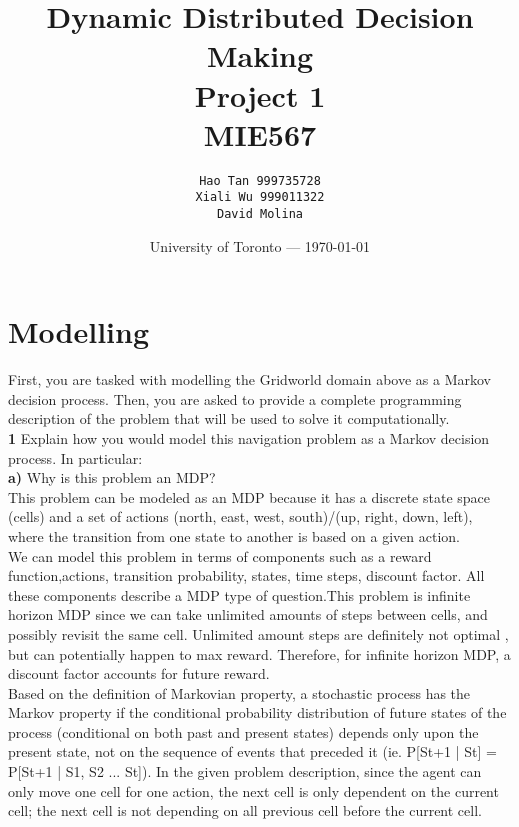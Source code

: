 \documentclass[11pt]{article}
\title{Dynamic Distributed Decision Making \\Project 1 \\MIE567} %
\author{\texttt{Hao Tan 999735728}\\ \texttt{Xiali Wu 999011322} \\ \texttt{David Molina}} %
\date{University of Toronto --- \today} %
\begin{document}
\maketitle

\section{Modelling}
First, you are tasked with modelling the Gridworld domain
above as a Markov decision process. Then, you are asked to provide a complete programming description of the problem that will be used to solve it computationally.
\\

\noindent
\textbf{1}
\noindent
Explain how you would model this navigation problem as a Markov
decision process. In particular:\\

\noindent
\textbf{a)}
\noindent
Why is this problem an MDP? \\

\noindent
This problem can be modeled as an MDP because it has a discrete state space (cells) and a set of actions (north, east, west, south)/(up, right, down, left), where the transition from one state to another is based on a given action.
\\

\noindent
We can model this problem in terms of components such as a reward function,actions, transition probability, states, time steps, discount factor. All these components describe a MDP type of question.This problem is infinite horizon MDP since we can take unlimited amounts of steps between cells, and possibly revisit the same cell. Unlimited amount steps are definitely not optimal , but can potentially happen to max reward. Therefore, for infinite horizon MDP, a discount factor accounts for future reward.
\\

\noindent
Based on the definition of Markovian property,  a stochastic process has the Markov property if the conditional probability distribution of future states of the process (conditional on both past and present states) depends only upon the present state, not on the sequence of events that preceded it (ie. P[St+1 | St] = P[St+1 | S1, S2 ... St]). In the given problem description, since the agent can only move one cell for one action, the next cell is only dependent on the current cell; the next cell is not depending on all previous cell before the current cell.
\\
\end{document}
